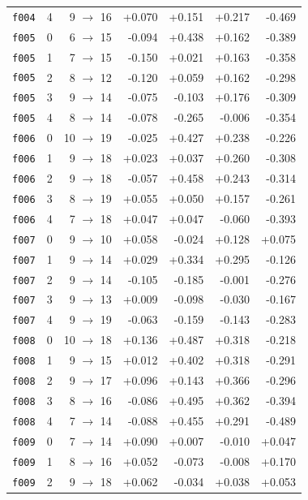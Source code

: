 \documentclass[11pt]{article}
\begin{document}
\begin{table}[htbp]
\begin{tabular}{llrrrrr}
\texttt{f004} & 4 & 9 $\to$ 16 & +0.070 & +0.151 & +0.217 & -0.469 \\
\texttt{f005} & 0 & 6 $\to$ 15 & -0.094 & +0.438 & +0.162 & -0.389 \\
\texttt{f005} & 1 & 7 $\to$ 15 & -0.150 & +0.021 & +0.163 & -0.358 \\
\texttt{f005} & 2 & 8 $\to$ 12 & -0.120 & +0.059 & +0.162 & -0.298 \\
\texttt{f005} & 3 & 9 $\to$ 14 & -0.075 & -0.103 & +0.176 & -0.309 \\
\texttt{f005} & 4 & 8 $\to$ 14 & -0.078 & -0.265 & -0.006 & -0.354 \\
\texttt{f006} & 0 & 10 $\to$ 19 & -0.025 & +0.427 & +0.238 & -0.226 \\
\texttt{f006} & 1 & 9 $\to$ 18 & +0.023 & +0.037 & +0.260 & -0.308 \\
\texttt{f006} & 2 & 9 $\to$ 18 & -0.057 & +0.458 & +0.243 & -0.314 \\
\texttt{f006} & 3 & 8 $\to$ 19 & +0.055 & +0.050 & +0.157 & -0.261 \\
\texttt{f006} & 4 & 7 $\to$ 18 & +0.047 & +0.047 & -0.060 & -0.393 \\
\texttt{f007} & 0 & 9 $\to$ 10 & +0.058 & -0.024 & +0.128 & +0.075 \\
\texttt{f007} & 1 & 9 $\to$ 14 & +0.029 & +0.334 & +0.295 & -0.126 \\
\texttt{f007} & 2 & 9 $\to$ 14 & -0.105 & -0.185 & -0.001 & -0.276 \\
\texttt{f007} & 3 & 9 $\to$ 13 & +0.009 & -0.098 & -0.030 & -0.167 \\
\texttt{f007} & 4 & 9 $\to$ 19 & -0.063 & -0.159 & -0.143 & -0.283 \\
\texttt{f008} & 0 & 10 $\to$ 18 & +0.136 & +0.487 & +0.318 & -0.218 \\
\texttt{f008} & 1 & 9 $\to$ 15 & +0.012 & +0.402 & +0.318 & -0.291 \\
\texttt{f008} & 2 & 9 $\to$ 17 & +0.096 & +0.143 & +0.366 & -0.296 \\
\texttt{f008} & 3 & 8 $\to$ 16 & -0.086 & +0.495 & +0.362 & -0.394 \\
\texttt{f008} & 4 & 7 $\to$ 14 & -0.088 & +0.455 & +0.291 & -0.489 \\
\texttt{f009} & 0 & 7 $\to$ 14 & +0.090 & +0.007 & -0.010 & +0.047 \\
\texttt{f009} & 1 & 8 $\to$ 16 & +0.052 & -0.073 & -0.008 & +0.170 \\
\texttt{f009} & 2 & 9 $\to$ 18 & +0.062 & -0.034 & +0.038 & +0.053 \\

\end{tabular}
\end{table}
\end{document}
